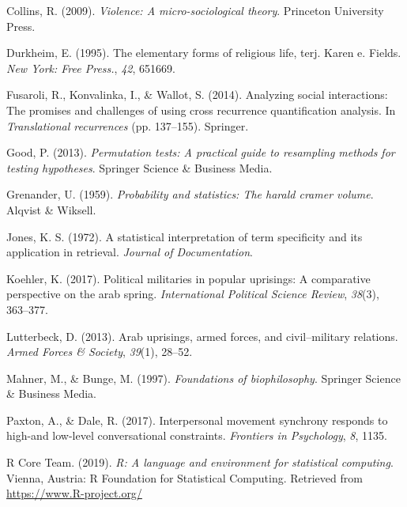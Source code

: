 \documentclass[english,man]{apa6}
\begin{document}
\leavevmode\hypertarget{ref-collins2009violence}{}%
Collins, R. (2009). \emph{Violence: A micro-sociological theory}. Princeton University Press.

\leavevmode\hypertarget{ref-durkheim1995elementary}{}%
Durkheim, E. (1995). The elementary forms of religious life, terj. Karen e. Fields. \emph{New York: Free Press.}, \emph{42}, 651669.

\leavevmode\hypertarget{ref-fusaroli2014analyzing}{}%
Fusaroli, R., Konvalinka, I., \& Wallot, S. (2014). Analyzing social interactions: The promises and challenges of using cross recurrence quantification analysis. In \emph{Translational recurrences} (pp. 137--155). Springer.

\leavevmode\hypertarget{ref-good2013permutation}{}%
Good, P. (2013). \emph{Permutation tests: A practical guide to resampling methods for testing hypotheses}. Springer Science \& Business Media.

\leavevmode\hypertarget{ref-grenander1959probability}{}%
Grenander, U. (1959). \emph{Probability and statistics: The harald cramer volume}. Alqvist \& Wiksell.

\leavevmode\hypertarget{ref-jones1972statistical}{}%
Jones, K. S. (1972). A statistical interpretation of term specificity and its application in retrieval. \emph{Journal of Documentation}.

\leavevmode\hypertarget{ref-koehler2017political}{}%
Koehler, K. (2017). Political militaries in popular uprisings: A comparative perspective on the arab spring. \emph{International Political Science Review}, \emph{38}(3), 363--377.

\leavevmode\hypertarget{ref-lutterbeck2013arab}{}%
Lutterbeck, D. (2013). Arab uprisings, armed forces, and civil--military relations. \emph{Armed Forces \& Society}, \emph{39}(1), 28--52.

\leavevmode\hypertarget{ref-mahner1997foundations}{}%
Mahner, M., \& Bunge, M. (1997). \emph{Foundations of biophilosophy}. Springer Science \& Business Media.

\leavevmode\hypertarget{ref-paxton2017interpersonal}{}%
Paxton, A., \& Dale, R. (2017). Interpersonal movement synchrony responds to high-and low-level conversational constraints. \emph{Frontiers in Psychology}, \emph{8}, 1135.

\leavevmode\hypertarget{ref-R-base}{}%
R Core Team. (2019). \emph{R: A language and environment for statistical computing}. Vienna, Austria: R Foundation for Statistical Computing. Retrieved from \url{https://www.R-project.org/}
\end{document}
